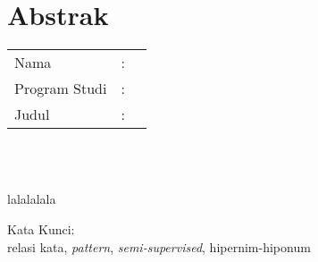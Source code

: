 %
%
%

\chapter*{Abstrak}

\vspace*{0.2cm}

\noindent \begin{tabular}{l l p{10cm}}
	Nama&: & \penulis \\
	Program Studi&: & \program \\
	Judul&: & \judul \\
\end{tabular} \\ 

\vspace*{0.5cm}

\noindent 
\\ lalalalala

\vspace*{0.2cm}

\noindent Kata Kunci: \\ 
\noindent relasi kata, \textit{pattern}, \textit{semi-supervised}, hipernim-hiponum\\ 

\newpage
